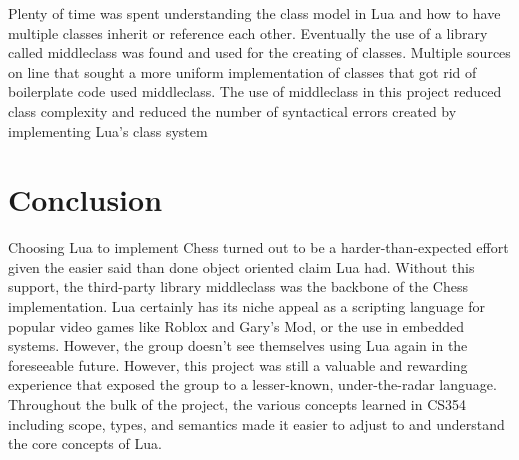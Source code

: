 \documentclass[12pt]{article}
\begin{document}
Plenty of time was spent understanding the class model in Lua and how to have multiple classes inherit or reference each other.  Eventually the use of a library called middleclass was found and used for the creating of classes.  Multiple sources on line that sought a more uniform implementation of classes that got rid of boilerplate code used middleclass.  The use of middleclass in this project reduced class complexity and reduced the number of syntactical errors created by implementing Lua's class system

\section{Conclusion}
Choosing Lua to implement Chess turned out to be a harder-than-expected effort given the easier said than done object oriented claim Lua had. Without this support, the third-party library middleclass was the backbone of the Chess implementation.  Lua certainly has its niche appeal as a scripting language for popular video games like Roblox and Gary's Mod, or the use in embedded systems. However, the group doesn't see themselves using Lua again in the foreseeable future. However, this project was still a valuable and rewarding experience that exposed the group to a lesser-known, under-the-radar language. Throughout the bulk of the project, the various concepts learned in CS354 including scope, types, and semantics made it easier to adjust to and understand the core concepts of Lua.
\end{document}
